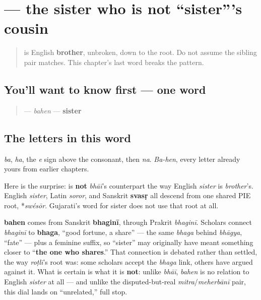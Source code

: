 \section[\texorpdfstring{\gu{બહેન} (bahen)}{બહેન (bahen)}]{ — the sister who is not \textquotedblleft{}sister\textquotedblright{}'s cousin}

\label{lesson:GU-C11-bahen}



\begin{quote}
\textbf{} is English \textbf{brother}, unbroken, down to the root. Do not assume the sibling pair matches. This chapter's last word breaks the pattern.
\end{quote}

\subsection*{You'll want to know first — one word}
\begin{quote}
\textbf{} — \emph{bahen} — \textbf{sister}
\end{quote}

\subsection*{The letters in this word}
\textbf{} \emph{ba}, \textbf{} \emph{ha}, \textbf{} the \emph{e} sign above the consonant, then \textbf{} \emph{na}. \emph{Ba-hen}, every letter already yours from earlier chapters.

\begin{cousinweb}
Here is the surprise: \textbf{} is \textbf{not} \emph{bhāī}'s counterpart the way English \emph{sister} is \emph{brother}'s. English \emph{sister}, Latin \emph{soror}, and Sanskrit \textbf{svasṛ} all descend from one shared PIE root, *\emph{swésōr}. Gujarati's word for sister does not use that root at all.

\textbf{bahen} comes from Sanskrit \textbf{bhaginī}, through Prakrit \emph{bhaginī}. Scholars connect \emph{bhaginī} to \textbf{bhaga}, \textquotedblleft{}good fortune, a share\textquotedblright{} — the same \emph{bhaga} behind \emph{bhāgya}, \textquotedblleft{}fate\textquotedblright{} — plus a feminine suffix, so \textquotedblleft{}sister\textquotedblright{} may originally have meant something closer to \textquotedblleft{}\textbf{the one who shares}.\textquotedblright{} That connection is debated rather than settled, the way \emph{roṭlī}'s root was: some scholars accept the \emph{bhaga} link, others have argued against it. What is certain is what it is \textbf{not}: unlike \emph{bhāī}, \emph{bahen} is no relation to English \emph{sister} at all — and unlike the disputed-but-real \emph{mitra}/\emph{meherbānī} pair, this dial lands on \textquotedblleft{}unrelated,\textquotedblright{} full stop.
\end{cousinweb}

